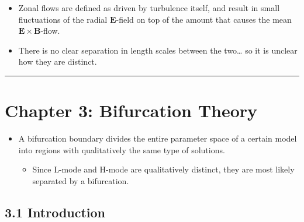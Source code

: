 \documentclass[a4paper]{article}
\begin{document}
\begin{itemize}
  \begin{itemize}
  \item
    Zonal flows are defined as driven by turbulence itself, and result
    in small fluctuations of the radial $\mathbf{E}$-field on top of the
    amount that causes the mean $\mathbf{E}\times\mathbf{B}$-flow.
  \item
    There is no clear separation in length scales between the
    two\ldots{} so it is unclear how they are distinct.
  \end{itemize}
\end{itemize}

\begin{center}\rule{3in}{0.4pt}\end{center}

\section{Chapter 3: Bifurcation
Theory}\label{chapter-3-bifurcation-theory}

\begin{itemize}
\item
  A bifurcation boundary divides the entire parameter space of a certain
  model into regions with qualitatively the same type of solutions.

  \begin{itemize}
  \itemsep1pt\parskip0pt
  \item
    Since L-mode and H-mode are qualitatively distinct, they are most
    likely separated by a bifurcation.
  \end{itemize}
\end{itemize}

\subsection{3.1 Introduction}\label{introduction}
\end{document}
